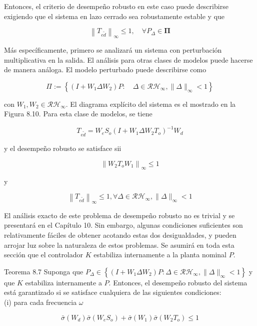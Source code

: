 Entonces, el criterio de desempeño robusto en este caso puede describirse exigiendo que el sistema en lazo cerrado sea robustamente estable y que


\begin{equation*}
\left\|T_{e \tilde{d}}\right\|_{\infty} \leq 1, \quad \forall P_{\Delta} \in \boldsymbol{\Pi} \tag{8.5}
\end{equation*}


Más específicamente, primero se analizará un sistema con perturbación multiplicativa en la salida. El análisis para otras clases de modelos puede hacerse de manera análoga. El modelo perturbado puede describirse como


\begin{equation*}
\Pi:=\left\{\left(I+W_{1} \Delta W_{2}\right) P: \quad \Delta \in \mathcal{R} \mathcal{H}_{\infty},\|\Delta\|_{\infty}<1\right\} \tag{8.6}
\end{equation*}


con $W_{1}, W_{2} \in \mathcal{R} \mathcal{H}_{\infty}$. El diagrama explícito del sistema es el mostrado en la Figura 8.10. Para esta clase de modelos, se tiene

$$
T_{e \tilde{d}}=W_{e} S_{o}\left(I+W_{1} \Delta W_{2} T_{o}\right)^{-1} W_{d}
$$

y el desempeño robusto se satisface sii

$$
\left\|W_{2} T_{o} W_{1}\right\|_{\infty} \leq 1
$$

y

$$
\left\|T_{e \tilde{d}}\right\|_{\infty} \leq 1, \forall \Delta \in \mathcal{R} \mathcal{H}_{\infty},\|\Delta\|_{\infty}<1
$$

El análisis exacto de este problema de desempeño robusto no es trivial y se presentará en el Capítulo 10. Sin embargo, algunas condiciones suficientes son relativamente fáciles de obtener acotando estas dos desigualdades, y pueden arrojar luz sobre la naturaleza de estos problemas. Se asumirá en toda esta sección que el controlador $K$ estabiliza internamente a la planta nominal $P$.

Teorema 8.7 Suponga que $P_{\Delta} \in\left\{\left(I+W_{1} \Delta W_{2}\right) P: \Delta \in \mathcal{R} \mathcal{H}_{\infty},\|\Delta\|_{\infty}<1\right\}$ y que $K$ estabiliza internamente a $P$. Entonces, el desempeño robusto del sistema está garantizado si se satisface cualquiera de las siguientes condiciones:\\
(i) para cada frecuencia $\omega$


\begin{equation*}
\bar{\sigma}\left(W_{d}\right) \bar{\sigma}\left(W_{e} S_{o}\right)+\bar{\sigma}\left(W_{1}\right) \bar{\sigma}\left(W_{2} T_{o}\right) \leq 1 \tag{8.7}
\end{equation*}



